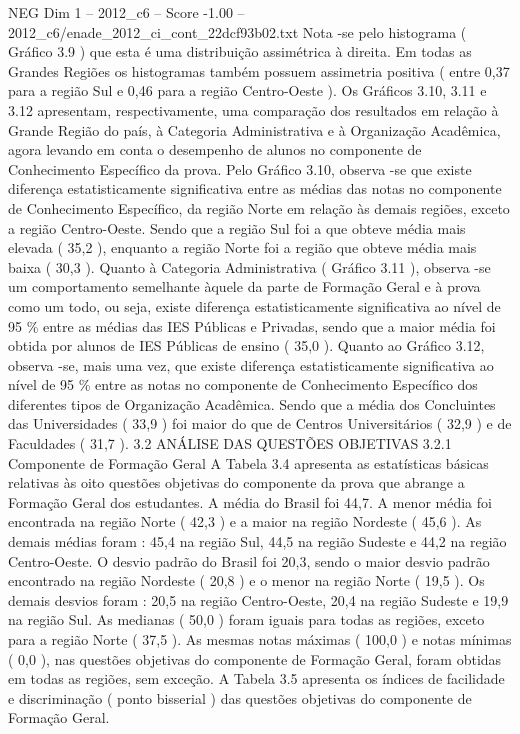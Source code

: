 \begin{textsample}{NEG Dim 1 – 2012\_c6 – Score -1.00 – 2012\_c6/enade\_2012\_ci\_cont\_22dcf93b02.txt}
Nota -se pelo histograma ( Gráfico 3.9 ) que esta é uma distribuição assimétrica à direita.
Em todas as Grandes Regiões os histogramas também possuem assimetria positiva ( entre 0,37 para a região Sul e 0,46 para a região Centro-Oeste ).
Os Gráficos 3.10, 3.11 e 3.12 apresentam, respectivamente, uma comparação dos resultados em relação à Grande Região do país, à Categoria Administrativa e à Organização Acadêmica, agora levando em conta o desempenho de alunos no componente de Conhecimento Específico da prova.
Pelo Gráfico 3.10, observa -se que existe diferença estatisticamente significativa entre as médias das notas no componente de Conhecimento Específico, da região Norte em relação às demais regiões, exceto a região Centro-Oeste.
Sendo que a região Sul foi a que obteve média mais elevada ( 35,2 ), enquanto a região Norte foi a região que obteve média mais baixa ( 30,3 ).
Quanto à Categoria Administrativa ( Gráfico 3.11 ), observa -se um comportamento semelhante àquele da parte de Formação Geral e à prova como um todo, ou seja, existe diferença estatisticamente significativa ao nível de 95 \% entre as médias das IES Públicas e Privadas, sendo que a maior média foi obtida por alunos de IES Públicas de ensino ( 35,0 ).
Quanto ao Gráfico 3.12, observa -se, mais uma vez, que existe diferença estatisticamente significativa ao nível de 95 \% entre as notas no componente de Conhecimento Específico dos diferentes tipos de Organização Acadêmica.
Sendo que a média dos Concluintes das Universidades ( 33,9 ) foi maior do que de Centros Universitários ( 32,9 ) e de Faculdades ( 31,7 ). 3.2 ANÁLISE DAS QUESTÕES OBJETIVAS 3.2.1 Componente de Formação Geral A Tabela 3.4 apresenta as estatísticas básicas relativas às oito questões objetivas do componente da prova que abrange a Formação Geral dos estudantes.
A média do Brasil foi 44,7.
A menor média foi encontrada na região Norte ( 42,3 ) e a maior na região Nordeste ( 45,6 ).
As demais médias foram : 45,4 na região Sul, 44,5 na região Sudeste e 44,2 na região Centro-Oeste.
O desvio padrão do Brasil foi 20,3, sendo o maior desvio padrão encontrado na região Nordeste ( 20,8 ) e o menor na região Norte ( 19,5 ).
Os demais desvios foram : 20,5 na região Centro-Oeste, 20,4 na região Sudeste e 19,9 na região Sul.
As medianas ( 50,0 ) foram iguais para todas as regiões, exceto para a região Norte ( 37,5 ).
As mesmas notas máximas ( 100,0 ) e notas mínimas ( 0,0 ), nas questões objetivas do componente de Formação Geral, foram obtidas em todas as regiões, sem exceção.
A Tabela 3.5 apresenta os índices de facilidade e discriminação ( ponto bisserial ) das questões objetivas do componente de Formação Geral.

\end{textsample}
